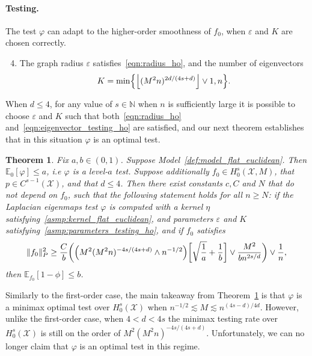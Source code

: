 \documentclass{article}
\newcommand{\floor}[1]{\left\lfloor #1 \right\rfloor}
\newcommand{\1}{\mathbf{1}}
\newcommand{\mc}[1]{\mathcal{#1}}
\newcommand{\Ebb}{\mathbb{E}}
\theoremstyle{alden}
\theoremstyle{aldenthm}
\newtheorem{theorem}{Theorem}
\theoremstyle{definition}
\theoremstyle{remark}
\begin{document}
\paragraph{Testing.} The test $\varphi$ can adapt to the higher-order smoothness of $f_0$, when $\varepsilon$ and $K$ are chosen correctly.
\begin{enumerate}[label=(P\arabic*)]
	\setcounter{enumi}{3}
	\item 
	\label{asmp:parameters_testing_ho}
	The graph radius $\varepsilon$ satisfies~\eqref{eqn:radius_ho}, and the number of eigenvectors
	\begin{equation}
	\label{eqn:eigenvector_testing_ho}
	K = \min\Bigl\{\floor{(M^2n)^{2d/(4s + d)}} \vee 1, n\Bigr\}.
	\end{equation}
\end{enumerate}
When $d \leq 4$, for any value of $s \in \mathbb{N}$ when $n$ is sufficiently large it is possible to choose $\varepsilon$ and $K$ such that both~\eqref{eqn:radius_ho} and~\eqref{eqn:eigenvector_testing_ho} are satisfied, and our next theorem establishes that in this situation $\varphi$ is an optimal test.
\begin{theorem}
	\label{thm:laplacian_eigenmaps_testing_ho}
	Fix $a,b \in (0,1)$. Suppose Model~\ref{def:model_flat_euclidean}. Then $\mathbb{E}_0[\varphi] \leq a$, i.e $\varphi$ is a level-$a$ test. Suppose additionally $f_0 \in H_0^s(\mc{X},M)$, that $p \in C^{s-1}(\mc{X})$, and that $d \leq 4$. Then there exist constants $c,C$ and $N$ that do not depend on $f_0$, such that the following statement holds for all $n \geq N$: if the Laplacian eigenmaps test $\varphi$ is computed with a kernel $\eta$ satisfying~\ref{asmp:kernel_flat_euclidean}, and parameters $\varepsilon$ and $K$ satisfying~\ref{asmp:parameters_testing_ho}, and if $f_0$ satisfies
	\begin{equation}
	\label{eqn:laplacian_eigenmaps_testing_criticalradius_ho}
	\|f_0\|_P^2 \geq \frac{C}{b}\biggl(\Bigl(M^2(M^2n)^{-4s/(4s + d) } \wedge n^{-1/2}\Bigr)\biggl[\sqrt{\frac{1}{a}} + \frac{1}{b}\biggr] \vee \frac{M^2}{b n^{2s/d}} \biggr) \vee \frac{1}{n},
	\end{equation}
	then $\Ebb_{f_0}[1 - \phi] \leq b$.
\end{theorem}
Similarly to the first-order case, the main takeaway from Theorem~\ref{thm:laplacian_eigenmaps_testing_ho} is that $\varphi$ is a minimax optimal test over $H_0^s(\mc{X})$ when $n^{-1/2} \lesssim M \lesssim n^{(4s - d)/4d}$. However, unlike the first-order case, when $4 < d < 4s$ the minimax testing rate over $H_0^s(\mc{X})$ is still on the order of $M^2(M^2n)^{-4s/(4s + d)}$. Unfortunately, we can no longer claim that $\varphi$ is an optimal test in this regime.
\end{document}
